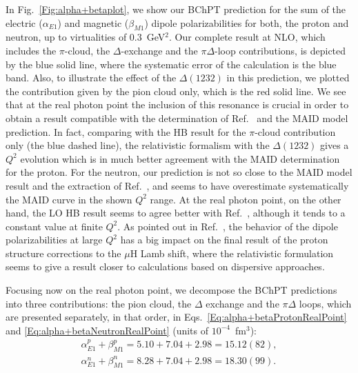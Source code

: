 \documentclass[twocolumn,prc,showpacs,nofootinbib,preprintnumbers,amsmath,amssymb,superscriptaddress]{revtex4-1}
\begin{document}
In Fig.~\ref{Fig:alpha+betaplot}, we show our BChPT prediction for the sum of the electric ($\alpha_{E1}$) and magnetic ($\beta_{M1}$) dipole polarizabilities for both, the proton and neutron, up to virtualities of $0.3$~GeV$^2$.
Our complete result at NLO, which includes the $\pi$-cloud, the $\Delta$-exchange and the $\pi \Delta$-loop contributions, is depicted by the blue solid line, where the systematic error of the calculation is the blue band.
Also, to illustrate the effect of the $\Delta(1232)$ in this prediction, we plotted the contribution given by the pion cloud only, which is the red solid line. 
We see that at the real photon point the inclusion of this resonance is crucial in order to obtain a result compatible with the determination of Ref.~\cite{Babusci:1997ij} and the MAID model prediction.
In fact, comparing with the HB result for the $\pi$-cloud contribution only \cite{Nevado:2007dd} (the blue dashed line), the relativistic formalism with the $\Delta(1232)$ gives a $Q^2$ evolution which is in much better agreement with the MAID determination for the proton.
For the neutron, our prediction is not so close to the MAID model result and the extraction of Ref.~\cite{Babusci:1997ij}, and seems to have overestimate systematically the MAID curve in the shown $Q^2$ range.
At the real photon point, on the other hand, the LO HB result seems to agree better with Ref.~\cite{Babusci:1997ij}, although it tends to a constant value at finite $Q^2$.
As pointed out in Ref.~\cite{Alarcon:2013cba}, the behavior of the dipole polarizabilities at large $Q^2$  has a big impact on the final result of the proton structure corrections to the $\mu$H Lamb shift, where the relativistic formulation seems to give a result closer to calculations based on dispersive approaches.
 
Focusing now on the real photon point, we decompose the BChPT predictions into three contributions:  the pion cloud, the $\Delta$ exchange and the $\pi \Delta$ loops, which are presented separately, in that order, in Eqs.~\eqref{Eq:alpha+betaProtonRealPoint} and \eqref{Eq:alpha+betaNeutronRealPoint} (units of $10^{-4}$~fm$^3$):
\begin{align}
\alpha_{E1}^p+\beta_{M1}^p = 5.10+7.04+2.98=15.12(82), \label{Eq:alpha+betaProtonRealPoint}\\
\alpha_{E1}^n+\beta_{M1}^n = 8.28+7.04+2.98=18.30(99). \label{Eq:alpha+betaNeutronRealPoint}
\end{align}
\end{document}
